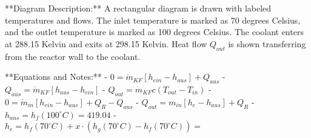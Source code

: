 **Diagram Description:**  
A rectangular diagram is drawn with labeled temperatures and flows. The inlet temperature is marked as 70 degrees Celsius, and the outlet temperature is marked as 100 degrees Celsius. The coolant enters at 288.15 Kelvin and exits at 298.15 Kelvin. Heat flow \( Q_{out} \) is shown transferring from the reactor wall to the coolant.

**Equations and Notes:**  
- \( 0 = \dot{m}_{KF} [h_{ein} - h_{aus}] + Q_{aus} \)  
- \( Q_{aus} = \dot{m}_{KF} [h_{aus} - h_{ein}] \)  
- \( Q_{out} = \dot{m}_{KF} c (T_{out} - T_{in}) \)  
- \( 0 = \dot{m}_{in} [h_{ein} - h_{aus}] + Q_{R} - Q_{aus} \)  
- \( Q_{out} = m_{in} [h_{e} - h_{aus}] + Q_{R} \)  
- \( h_{aus} = h_f (100^\circ C) = 419.04 \)  
- \( h_{e} = h_f (70^\circ C) + x \cdot (h_g (70^\circ C) - h_f (70^\circ C)) = \)
